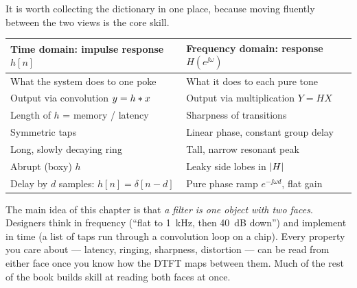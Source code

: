 It is worth collecting the dictionary in one place, because moving fluently
between the two views is the core skill.

\begin{center}
\renewcommand{\arraystretch}{1.3}
\begin{tabular}{@{}p{} p{}@{}}
\toprule
\textbf{Time domain: impulse response $h[n]$} & \textbf{Frequency domain: response $H(e^{\jj\omega})$} \\
\midrule
What the system does to one poke & What it does to each pure tone \\
Output via convolution $y=h\ast x$ & Output via multiplication $Y=HX$ \\
Length of $h$ = memory / latency & Sharpness of transitions \\
Symmetric taps & Linear phase, constant group delay \\
Long, slowly decaying ring & Tall, narrow resonant peak \\
Abrupt (boxy) $h$ & Leaky side lobes in $\lvert H\rvert$ \\
Delay by $d$ samples: $h[n]=\delta[n-d]$ & Pure phase ramp $e^{-\jj\omega d}$, flat gain \\
\bottomrule
\end{tabular}
\end{center}

\begin{aestheticbox}
The main idea of this chapter is that \emph{a filter is one object with two
faces}. Designers think in frequency (``flat to 1~kHz, then 40~dB down'') and
implement in time (a list of taps run through a convolution loop on a chip).
Every property you care about --- latency, ringing, sharpness, distortion ---
can be read from either face once you know how the DTFT maps between them. Much of
the rest of the book builds skill at reading both faces at once.
\end{aestheticbox}

